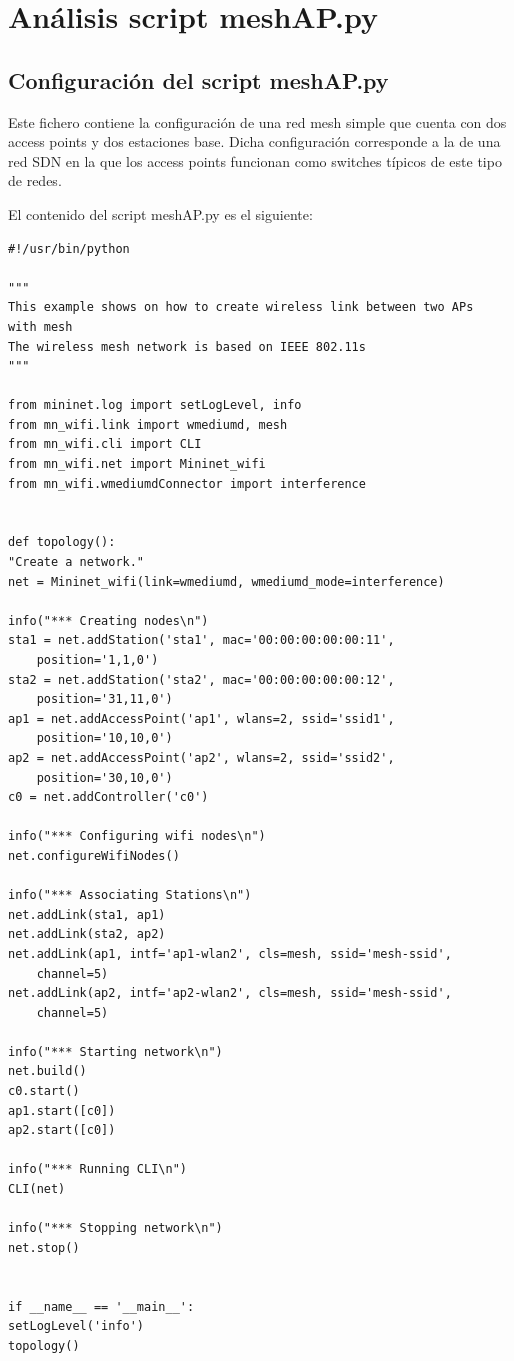 \documentclass[a4paper,12pt,twoside,spanish]{book}
\begin{document}
\chapter{Análisis script meshAP.py}
\section{Configuración del script meshAP.py}

Este fichero contiene la configuración de una red mesh simple que cuenta con dos access points y dos estaciones base. Dicha configuración corresponde a la de una red SDN en la que los access points funcionan como switches típicos de este tipo de redes.\par

El contenido del script meshAP.py es el siguiente: \par

\begin{lstlisting}
#!/usr/bin/python

"""
This example shows on how to create wireless link between two APs 
with mesh
The wireless mesh network is based on IEEE 802.11s
"""

from mininet.log import setLogLevel, info
from mn_wifi.link import wmediumd, mesh
from mn_wifi.cli import CLI
from mn_wifi.net import Mininet_wifi
from mn_wifi.wmediumdConnector import interference


def topology():
"Create a network."
net = Mininet_wifi(link=wmediumd, wmediumd_mode=interference)

info("*** Creating nodes\n")
sta1 = net.addStation('sta1', mac='00:00:00:00:00:11', 
	position='1,1,0')
sta2 = net.addStation('sta2', mac='00:00:00:00:00:12', 
	position='31,11,0')
ap1 = net.addAccessPoint('ap1', wlans=2, ssid='ssid1', 
	position='10,10,0')
ap2 = net.addAccessPoint('ap2', wlans=2, ssid='ssid2', 
	position='30,10,0')
c0 = net.addController('c0')

info("*** Configuring wifi nodes\n")
net.configureWifiNodes()

info("*** Associating Stations\n")
net.addLink(sta1, ap1)
net.addLink(sta2, ap2)
net.addLink(ap1, intf='ap1-wlan2', cls=mesh, ssid='mesh-ssid', 
	channel=5)
net.addLink(ap2, intf='ap2-wlan2', cls=mesh, ssid='mesh-ssid', 
	channel=5)

info("*** Starting network\n")
net.build()
c0.start()
ap1.start([c0])
ap2.start([c0])

info("*** Running CLI\n")
CLI(net)

info("*** Stopping network\n")
net.stop()


if __name__ == '__main__':
setLogLevel('info')
topology()
\end{lstlisting}
\end{document}
